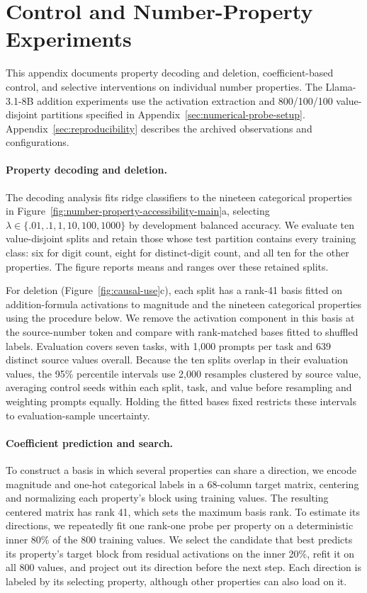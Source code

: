 \documentclass[11pt]{article}
\newcommand{\appendixsection}[1]{%
  \section{#1}%
  \addcontentsline{atc}{section}{\protect\numberline{\thesection}#1}%
}
\begin{document}
\appendixsection{Control and Number-Property Experiments}
\label{sec:numerical-control-dimension}

This appendix documents property decoding and deletion, coefficient-based control, and selective interventions on individual number properties.
The Llama-3.1-8B addition experiments use the activation extraction and 800/100/100 value-disjoint partitions specified in Appendix~\ref{sec:numerical-probe-setup}.
Appendix~\ref{sec:reproducibility} describes the archived observations and configurations.

\paragraph{Property decoding and deletion.}
\label{sec:number-property-geometry}

The decoding analysis fits ridge classifiers to the nineteen categorical properties in Figure~\ref{fig:number-property-accessibility-main}a, selecting $\lambda\in\{.01,.1,1,10,100,1000\}$ by development balanced accuracy.
We evaluate ten value-disjoint splits and retain those whose test partition contains every training class: six for digit count, eight for distinct-digit count, and all ten for the other properties.
The figure reports means and ranges over these retained splits.

For deletion (Figure~\ref{fig:causal-use}c), each split has a rank-41 basis fitted on addition-formula activations to magnitude and the nineteen categorical properties using the procedure below.
We remove the activation component in this basis at the source-number token and compare with rank-matched bases fitted to shuffled labels.
Evaluation covers seven tasks, with 1,000 prompts per task and 639 distinct source values overall.
Because the ten splits overlap in their evaluation values, the 95\% percentile intervals use 2,000 resamples clustered by source value, averaging control seeds within each split, task, and value before resampling and weighting prompts equally.
Holding the fitted bases fixed restricts these intervals to evaluation-sample uncertainty.

\paragraph{Coefficient prediction and search.}
\label{sec:property-coefficient-control}

To construct a basis in which several properties can share a direction, we encode magnitude and one-hot categorical labels in a 68-column target matrix, centering and normalizing each property's block using training values.
The resulting centered matrix has rank 41, which sets the maximum basis rank.
To estimate its directions, we repeatedly fit one rank-one probe per property on a deterministic inner 80\% of the 800 training values.
We select the candidate that best predicts its property's target block from residual activations on the inner 20\%, refit it on all 800 values, and project out its direction before the next step.
Each direction is labeled by its selecting property, although other properties can also load on it.
\end{document}
